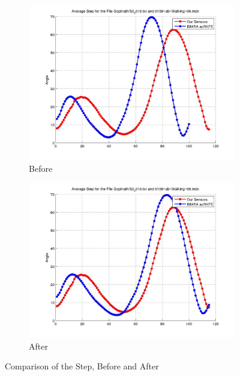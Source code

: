 \documentclass[12pt]{article}
\begin{document}
\begin{figure}[h]%

\begin{subfigure}[!htb]{2cm}
\hspace*{-2cm} \includegraphics[scale=.22]{S0_0016_before.jpg}
\caption{Before}
\end{subfigure}
\hfill\hfill
\begin{subfigure}[h]{0.4\textwidth}
\hspace*{-2cm} \includegraphics[scale=.22]{S0_0016_after.jpg}
\caption{After}
\end{subfigure}%

\caption[Hello]{Comparison of the Step, Before and After}
\end{figure}
\end{document}

